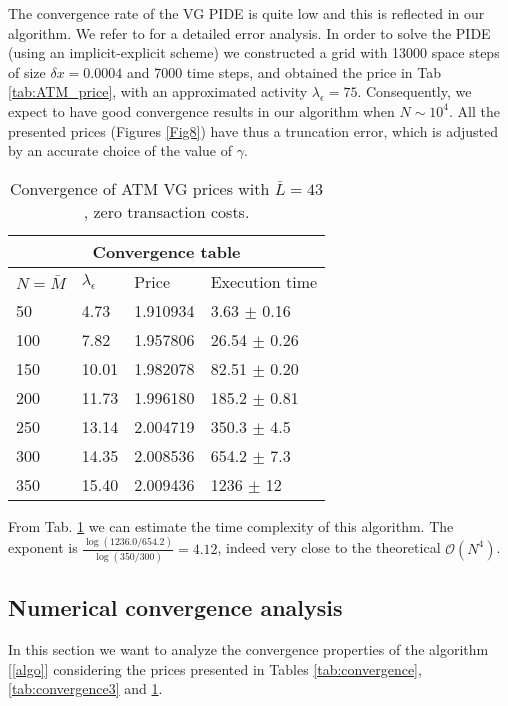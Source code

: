 The convergence rate of the VG PIDE is quite low and this is reflected in our algorithm. We refer to \cite{CoVo05b} for a detailed error analysis.
In order to solve the PIDE (using an implicit-explicit scheme) we constructed
a grid with 13000 space steps of size $\delta x = 0.0004$ and 7000 time steps, and obtained the price in Tab \ref{tab:ATM_price}, 
with an approximated activity $\lambda_{\epsilon} = 75$.
Consequently, we expect to have good convergence results in our algorithm when $N\sim 10^4$.
All the presented prices (Figures \ref{Fig8}) have thus a truncation error, which is adjusted by an accurate choice of the value of $\gamma$. 
\begin{table}[ht]
\centering
 \begin{tabular}{llll}
 \toprule
  \multicolumn{4}{c}{\textbf{Convergence table}} \\
  \midrule
  $N = \bar M$ & $\lambda_{\epsilon}$ & Price & Execution time \\
  \midrule
    50  & 4.73  & 1.910934 & 3.63 $\pm$ 0.16 \\
    100 & 7.82  & 1.957806 & 26.54 $\pm$ 0.26 \\
    150 & 10.01 & 1.982078 & 82.51 $\pm$ 0.20 \\
    200 & 11.73 & 1.996180 & 185.2 $\pm$ 0.81 \\
    250 & 13.14 & 2.004719 & 350.3 $\pm$ 4.5 \\
    300 & 14.35 & 2.008536 & 654.2 $\pm$ 7.3\\ 
    350 & 15.40 & 2.009436 & 1236 $\pm$ 12 \\
  \bottomrule
  \end{tabular}
  \caption{Convergence of ATM VG prices with $\bar L =43$, zero transaction costs.}
  \label{tab:convergence4}
\end{table}

From Tab. \ref{tab:convergence4} we can estimate the time complexity of this algorithm. The exponent is $\frac{\log(1236.0/654.2)}{\log(350/300)} = 4.12$, 
indeed very close to the theoretical $\mathcal{O}(N^4)$. 


\subsection{Numerical convergence analysis}\label{num_conv_analysis}

In this section we want to analyze the convergence properties of the algorithm [\ref{algo}] considering the prices presented in 
Tables \ref{tab:convergence}, \ref{tab:convergence3} and \ref{tab:convergence4}. 

